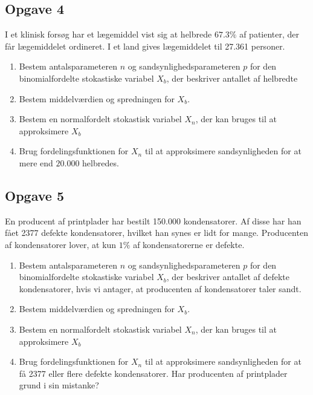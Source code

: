 \subsection*{Opgave 4}
I et klinisk forsøg har et lægemiddel vist sig at helbrede $67.3\%$ af patienter, der får lægemiddelet ordineret. I et land gives lægemiddelet til 27.361 personer.
\begin{enumerate}[label=\roman*)]
	\item Bestem antalsparameteren $n$ og sandsynlighedsparameteren $p$ for den binomialfordelte stokastiske variabel $X_b$, der beskriver antallet af helbredte
	\item Bestem middelværdien og spredningen for $X_b$.
	\item Bestem en normalfordelt stokastisk variabel $X_n$, der kan bruges til at approksimere $X_b$
	\item Brug fordelingsfunktionen for $X_n$ til at approksimere sandsynligheden for at mere end $20.000$ helbredes. 
\end{enumerate}

\subsection*{Opgave 5}

En producent af printplader har bestilt 150.000 kondensatorer. Af disse har han fået 2377 defekte kondensatorer, hvilket han synes er lidt for mange. Producenten af kondensatorer lover, at kun $1\%$ af kondensatorerne er defekte. 
\begin{enumerate}[label=\roman*)]
	\item Bestem antalsparameteren $n$ og sandsynlighedsparameteren $p$ for den binomialfordelte stokastiske variabel $X_b$, der beskriver antallet af defekte kondensatorer, hvis 
	vi antager, at producenten af kondensatorer taler sandt. 
	\item Bestem middelværdien og spredningen for $X_b$.
	\item Bestem en normalfordelt stokastisk variabel $X_n$, der kan bruges til at approksimere $X_b$
	\item Brug fordelingsfunktionen for $X_n$ til at approksimere sandsynligheden for at få 2377 eller flere defekte kondensatorer. Har producenten af printplader grund i sin mistanke?
\end{enumerate}